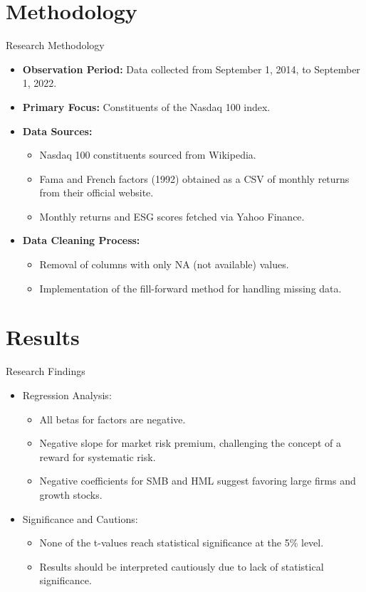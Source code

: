 \documentclass{beamer}
\begin{document}
\section{Methodology}
\begin{frame}{Research Methodology}
  \begin{itemize}
    \item \textbf{Observation Period:} Data collected from September 1, 2014, to September 1, 2022.
    \item \textbf{Primary Focus:} Constituents of the Nasdaq 100 index.
    \item \textbf{Data Sources:}
      \begin{itemize}
        \item Nasdaq 100 constituents sourced from Wikipedia.
        \item Fama and French factors (1992) obtained as a CSV of monthly returns from their official website.
        \item Monthly returns and ESG scores fetched via Yahoo Finance.
      \end{itemize}
    \item \textbf{Data Cleaning Process:}
      \begin{itemize}
        \item Removal of columns with only NA (not available) values.
        \item Implementation of the fill-forward method for handling missing data.
      \end{itemize}
  \end{itemize}
\end{frame}

\section{Results}
\begin{frame}{Research Findings}
  \begin{itemize}
    \item Regression Analysis:
      \begin{itemize}
        \item All betas for \textcite{FamaFrench1992} factors are negative.
        \item Negative slope for market risk premium, challenging the concept of a reward for systematic risk.
        \item Negative coefficients for SMB and HML suggest favoring large firms and growth stocks.
      \end{itemize}
    \item Significance and Cautions:
      \begin{itemize}
        \item None of the t-values reach statistical significance at the 5\% level.
        \item Results should be interpreted cautiously due to lack of statistical significance.
      \end{itemize}
  \end{itemize}
\end{frame}
\end{document}
